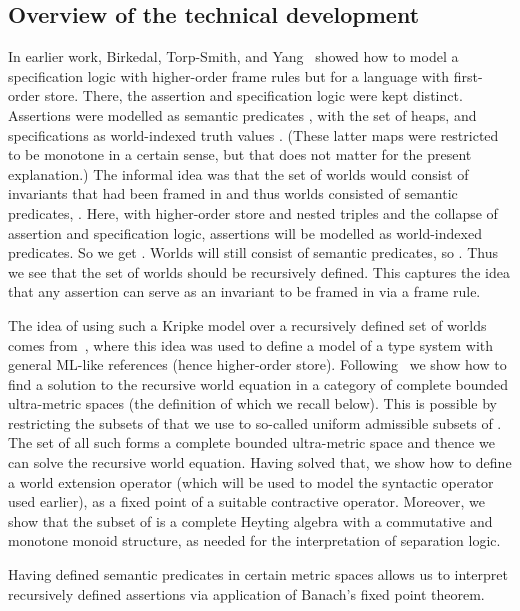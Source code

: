 \documentclass{LMCS}
\theoremstyle{remark}
\begin{document}
\subsection{Overview of the technical development}
\label{sec:overview-of-technical-development}

In earlier work, Birkedal, Torp-Smith, and
Yang~\cite{BirkedalL:semslt-lmcs,Birkedal:Yang:parsepl-journal} showed
how to model a specification logic with higher-order frame rules but
for a language with first-order store. There, the assertion and specification 
logic were kept distinct. Assertions were modelled as semantic predicates
, with  the set of heaps,
and specifications as world-indexed truth values . (These latter maps were
restricted to be monotone in a certain sense, but that does not matter for the present
explanation.)
The informal idea was that the set of worlds would consist of invariants that 
had been framed in and thus worlds consisted of semantic predicates, . Here, with 
higher-order store and nested triples and the collapse of assertion and
specification logic, assertions will be modelled as world-indexed predicates.
So we get . Worlds will still consist of semantic predicates,
so . Thus we see that the set of worlds  should be recursively
defined.  This captures the idea that any assertion can serve as an invariant to 
be framed in via a frame rule.

The idea of using such a Kripke model over a recursively defined set
of worlds comes from~\cite{Birkedal:Stovring:Thamsborg:09}, where this
idea was used to define a model of a type system with general ML-like
references (hence higher-order store). Following~\cite{Birkedal:Stovring:Thamsborg:09} we show how to
find a solution to the recursive world equation in a category of
complete bounded ultra-metric spaces (the definition of which we
recall below). This is possible by restricting the subsets of  that
we use to so-called uniform admissible subsets of . The set 
of all such forms a complete bounded ultra-metric space and thence we
can solve the recursive world equation.  Having solved that, we show how
to define a world extension operator  (which will be used to model
the syntactic  operator used earlier), as a fixed point of a suitable contractive
operator. 
Moreover, we show that the subset  of  is a complete Heyting algebra with a commutative and monotone monoid structure, 
as needed for the interpretation of separation logic. 

Having defined semantic predicates in certain metric spaces allows us
to interpret recursively defined assertions via application of
Banach's fixed point theorem.
\end{document}
